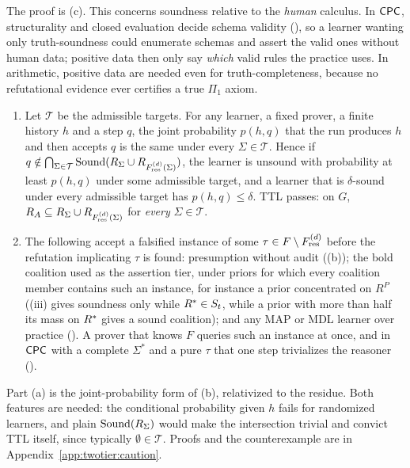 The proof is (c). This concerns soundness relative to the \emph{human} calculus. In $\mathsf{CPC}$, structurality and closed evaluation decide schema validity (), so a learner wanting only truth-soundness could enumerate schemas and assert the valid ones without human data; positive data then only say \emph{which} valid rules the practice uses. In arithmetic, positive data are needed even for truth-completeness, because no refutational evidence ever certifies a true $\Pi_1$ axiom.

\begin{proposition}\label{prop:twotier:caution}
\leavevmode
\begin{enumerate}[label=(\alph*),leftmargin=*]
\item Let $\mathcal T$ be the admissible targets. For any learner, a fixed prover, a finite history $h$ and a step $q$, the joint probability $p(h,q)$ that the run produces $h$ and then accepts $q$ is the same under every $\Sigma\in\mathcal T$. Hence if $q\notin\bigcap_{\Sigma\in\mathcal T}\mathrm{Sound}(R_\Sigma\cup R_{F^{(d)}_{\mathrm{res}}(\Sigma)})$, the learner is unsound with probability at least $p(h,q)$ under some admissible target, and a learner that is $\delta$-sound under every admissible target has $p(h,q)\le\delta$. TTL passes: on $G$, $R_A\subseteq R_\Sigma\cup R_{F^{(d)}_{\mathrm{res}}(\Sigma)}$ for \emph{every} $\Sigma\in\mathcal T$.
\item The following accept a falsified instance of some $\tau\in F\setminus F^{(d)}_{\mathrm{res}}$ before the refutation implicating $\tau$ is found: presumption without audit ((b)); the bold coalition used as the assertion tier, under priors for which every coalition member contains such an instance, for instance a prior concentrated on $R^P$ ((iii) gives soundness only while $R^{*}\in S_t$, while a prior with more than half its mass on $R^{*}$ gives a sound coalition); and any MAP or MDL learner over practice (). A prover that knows $F$ queries such an instance at once, and in $\mathsf{CPC}$ with a complete $\Sigma^*$ and a pure $\tau$ that one step trivializes the reasoner ().
\end{enumerate}
\end{proposition}

Part (a) is the joint-probability form of (b), relativized to the residue. Both features are needed: the conditional probability given $h$ fails for randomized learners, and plain $\mathrm{Sound}(R_\Sigma)$ would make the intersection trivial and convict TTL itself, since typically $\emptyset\in\mathcal T$. Proofs and the counterexample are in Appendix~\ref{app:twotier:caution}.


